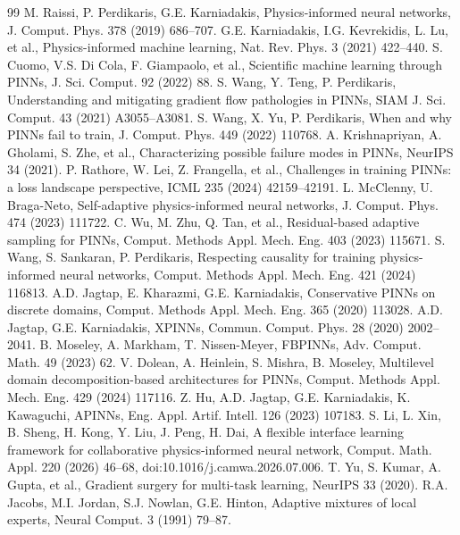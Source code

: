 \documentclass[preprint,12pt]{elsarticle}
\theoremstyle{remark}
\begin{document}
\begin{thebibliography}{99}\footnotesize
{} M. Raissi, P. Perdikaris, G.E. Karniadakis, Physics-informed neural networks, J. Comput. Phys. 378 (2019) 686--707.
 G.E. Karniadakis, I.G. Kevrekidis, L. Lu, et al., Physics-informed machine learning, Nat. Rev. Phys. 3 (2021) 422--440.
 S. Cuomo, V.S. Di Cola, F. Giampaolo, et al., Scientific machine learning through PINNs, J. Sci. Comput. 92 (2022) 88.
 S. Wang, Y. Teng, P. Perdikaris, Understanding and mitigating gradient flow pathologies in PINNs, SIAM J. Sci. Comput. 43 (2021) A3055--A3081.
 S. Wang, X. Yu, P. Perdikaris, When and why PINNs fail to train, J. Comput. Phys. 449 (2022) 110768.
 A. Krishnapriyan, A. Gholami, S. Zhe, et al., Characterizing possible failure modes in PINNs, NeurIPS 34 (2021).
 P. Rathore, W. Lei, Z. Frangella, et al., Challenges in training PINNs: a loss landscape perspective, ICML 235 (2024) 42159--42191.
 L. McClenny, U. Braga-Neto, Self-adaptive physics-informed neural networks, J. Comput. Phys. 474 (2023) 111722.
 C. Wu, M. Zhu, Q. Tan, et al., Residual-based adaptive sampling for PINNs, Comput. Methods Appl. Mech. Eng. 403 (2023) 115671.
 S. Wang, S. Sankaran, P. Perdikaris, Respecting causality for training physics-informed neural networks, Comput. Methods Appl. Mech. Eng. 421 (2024) 116813.
 A.D. Jagtap, E. Kharazmi, G.E. Karniadakis, Conservative PINNs on discrete domains, Comput. Methods Appl. Mech. Eng. 365 (2020) 113028.
 A.D. Jagtap, G.E. Karniadakis, XPINNs, Commun. Comput. Phys. 28 (2020) 2002--2041.
 B. Moseley, A. Markham, T. Nissen-Meyer, FBPINNs, Adv. Comput. Math. 49 (2023) 62.
 V. Dolean, A. Heinlein, S. Mishra, B. Moseley, Multilevel domain decomposition-based architectures for PINNs, Comput. Methods Appl. Mech. Eng. 429 (2024) 117116.
 Z. Hu, A.D. Jagtap, G.E. Karniadakis, K. Kawaguchi, APINNs, Eng. Appl. Artif. Intell. 126 (2023) 107183.
 S. Li, L. Xin, B. Sheng, H. Kong, Y. Liu, J. Peng, H. Dai, A flexible interface learning framework for collaborative physics-informed neural network, Comput. Math. Appl. 220 (2026) 46--68, doi:10.1016/j.camwa.2026.07.006.
 T. Yu, S. Kumar, A. Gupta, et al., Gradient surgery for multi-task learning, NeurIPS 33 (2020).
 R.A. Jacobs, M.I. Jordan, S.J. Nowlan, G.E. Hinton, Adaptive mixtures of local experts, Neural Comput. 3 (1991) 79--87.

\end{thebibliography}
\end{document}
